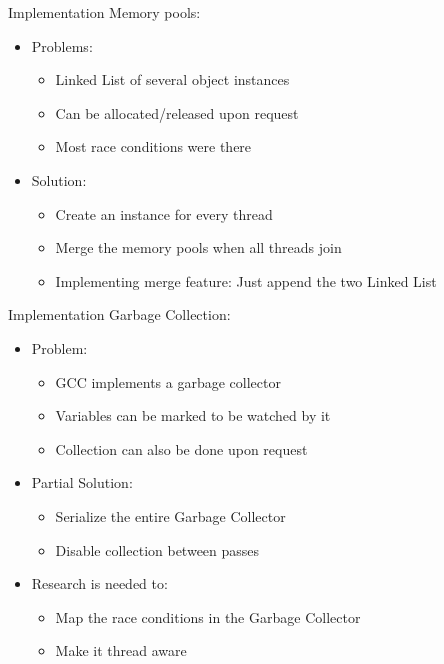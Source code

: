 \begin{frame}{Implementation}
    Memory pools:
    \begin{itemize}
        \item Problems:
            \begin{itemize}
                \item Linked List of several object instances
                \item Can be allocated/released upon request
                \item Most race conditions were there
            \end{itemize}
        \item Solution:
            \begin{itemize}
                \item Create an instance for every thread
                \item Merge the memory pools when all threads join
                \item Implementing merge feature: Just append the two Linked List
            \end{itemize}
    \end{itemize}
\end{frame}

\begin{frame}{Implementation}
    Garbage Collection: 
    \begin{itemize}
        \item Problem: 
            \begin{itemize}
                \item GCC implements a garbage collector 
                \item Variables can be marked to be watched by it
                \item Collection can also be done upon request
            \end{itemize}
        \item Partial Solution:
            \begin{itemize}
                \item Serialize the entire Garbage Collector
                \item Disable collection between passes
            \end{itemize}
        \item Research is needed to:
            \begin{itemize}
                \item Map the race conditions in the Garbage Collector 
                \item Make it thread aware
            \end{itemize}
    \end{itemize}
\end{frame}

